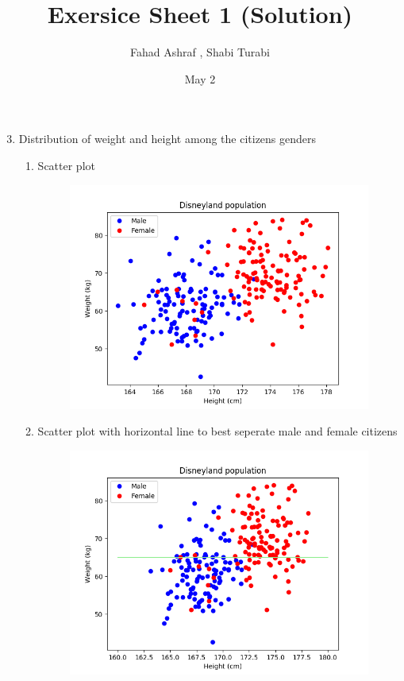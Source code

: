 \documentclass[12pt, a4paper]{article}
\title{Exersice Sheet 1 (Solution)}
\author{Fahad Ashraf , Shabi Turabi}
\date{May 2}
\begin{document}
 
\begin{titlepage}
\maketitle
\end{titlepage}

\begin{enumerate}
    \setcounter{enumi}{2}
	\item Distribution of weight and height among the citizens genders
	\begin{enumerate}
        \item Scatter plot
        \begin{figure}[h]
            \centering
            \includegraphics[width=10cm]{scatter_plot}
        \end{figure}
		\item Scatter plot with horizontal line to best seperate male and female citizens
        \begin{figure}[h]
            \centering
            \includegraphics[width=10cm]{scatter_plot_line1}
        \end{figure}

\end{enumerate}
\end{enumerate}
\end{document}
